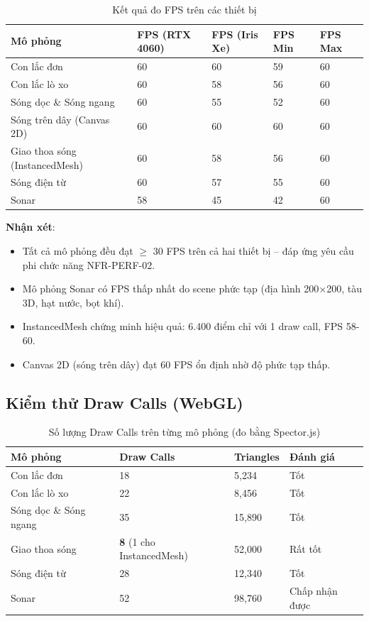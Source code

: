 \begin{table}[H]
\centering
\caption{Kết quả đo FPS trên các thiết bị}
\begin{tabular}{|p{}|p{}|p{}|p{}|p{}|}
\hline
\textbf{Mô phỏng} & \textbf{FPS (RTX 4060)} & \textbf{FPS (Iris Xe)} & \textbf{FPS Min} & \textbf{FPS Max} \\
\hline
Con lắc đơn & 60 & 60 & 59 & 60 \\
\hline
Con lắc lò xo & 60 & 58 & 56 & 60 \\
\hline
Sóng dọc \& Sóng ngang & 60 & 55 & 52 & 60 \\
\hline
Sóng trên dây (Canvas 2D) & 60 & 60 & 60 & 60 \\
\hline
Giao thoa sóng (InstancedMesh) & 60 & 58 & 56 & 60 \\
\hline
Sóng điện từ & 60 & 57 & 55 & 60 \\
\hline
Sonar & 58 & 45 & 42 & 60 \\
\hline
\end{tabular}
\end{table}

\textbf{Nhận xét}:
\begin{itemize}
    \item Tất cả mô phỏng đều đạt $\geq$ 30 FPS trên cả hai thiết bị – đáp ứng yêu cầu phi chức năng NFR-PERF-02.
    \item Mô phỏng Sonar có FPS thấp nhất do scene phức tạp (địa hình 200×200, tàu 3D, hạt nước, bọt khí).
    \item InstancedMesh chứng minh hiệu quả: 6.400 điểm chỉ với 1 draw call, FPS 58-60.
    \item Canvas 2D (sóng trên dây) đạt 60 FPS ổn định nhờ độ phức tạp thấp.
\end{itemize}

\subsection{Kiểm thử Draw Calls (WebGL)}

\begin{table}[H]
\centering
\caption{Số lượng Draw Calls trên từng mô phỏng (đo bằng Spector.js)}
\begin{tabular}{|p{}|p{}|p{}|p{}|}
\hline
\textbf{Mô phỏng} & \textbf{Draw Calls} & \textbf{Triangles} & \textbf{Đánh giá} \\
\hline
Con lắc đơn & 18 & 5,234 & Tốt \\
\hline
Con lắc lò xo & 22 & 8,456 & Tốt \\
\hline
Sóng dọc \& Sóng ngang & 35 & 15,890 & Tốt \\
\hline
Giao thoa sóng & \textbf{8} (1 cho InstancedMesh) & 52,000 & Rất tốt \\
\hline
Sóng điện từ & 28 & 12,340 & Tốt \\
\hline
Sonar & 52 & 98,760 & Chấp nhận được \\
\hline
\end{tabular}
\end{table}

